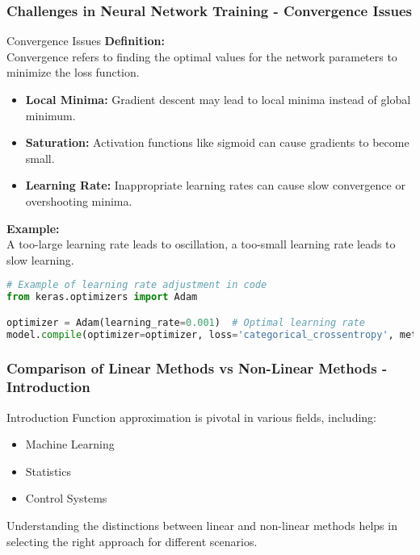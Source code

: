 \documentclass[aspectratio=169]{beamer}
\begin{document}
\begin{frame}[fragile]
    \frametitle{Challenges in Neural Network Training - Convergence Issues}
    \begin{block}{Convergence Issues}
        \textbf{Definition:} \\
        Convergence refers to finding the optimal values for the network parameters to minimize the loss function.
    \end{block}

    \begin{itemize}
        \item \textbf{Local Minima:} Gradient descent may lead to local minima instead of global minimum.
        \item \textbf{Saturation:} Activation functions like sigmoid can cause gradients to become small.
        \item \textbf{Learning Rate:} Inappropriate learning rates can cause slow convergence or overshooting minima.
    \end{itemize}

    \textbf{Example:} \\
    A too-large learning rate leads to oscillation, a too-small learning rate leads to slow learning.

    \begin{lstlisting}[language=Python, basicstyle=\small]
# Example of learning rate adjustment in code
from keras.optimizers import Adam

optimizer = Adam(learning_rate=0.001)  # Optimal learning rate
model.compile(optimizer=optimizer, loss='categorical_crossentropy', metrics=['accuracy'])
    \end{lstlisting}
\end{frame}

\begin{frame}[fragile]
    \frametitle{Comparison of Linear Methods vs Non-Linear Methods - Introduction}
    \begin{block}{Introduction}
        Function approximation is pivotal in various fields, including:
        \begin{itemize}
            \item Machine Learning
            \item Statistics
            \item Control Systems
        \end{itemize}
        Understanding the distinctions between linear and non-linear methods helps in selecting the right approach for different scenarios.
    \end{block}
\end{frame}
\end{document}

